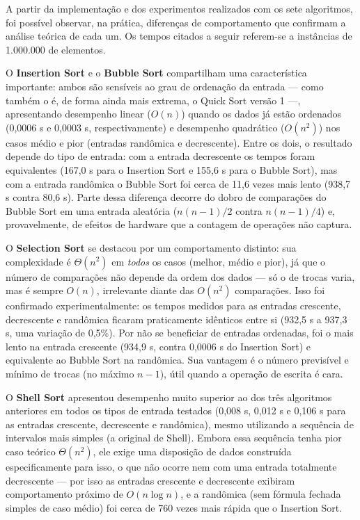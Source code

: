 \qquad A partir da implementação e dos experimentos realizados com os
sete algoritmos, foi possível observar, na prática, diferenças de
comportamento que confirmam a análise teórica de cada um. Os tempos
citados a seguir referem-se a instâncias de 1.000.000 de elementos.

\qquad O \textbf{Insertion Sort} e o \textbf{Bubble Sort} compartilham uma
característica importante: ambos são sensíveis ao grau de ordenação
da entrada --- como também o é, de forma ainda mais extrema, o Quick
Sort versão 1 ---, apresentando desempenho linear ($O(n)$) quando os
dados já estão ordenados (0,0006 s e 0,0003 s, respectivamente) e desempenho
quadrático ($O(n^2)$) nos casos médio e pior (entradas randômica e
decrescente). Entre os dois, o resultado depende do tipo de entrada:
com a entrada decrescente os tempos foram equivalentes (167,0 s para o
Insertion Sort e 155,6 s para o Bubble Sort), mas com a entrada
randômica o Bubble Sort foi cerca de 11,6 vezes mais lento (938,7 s
contra 80,6 s). Parte dessa diferença decorre do dobro de comparações do
Bubble Sort em uma entrada aleatória ($n(n-1)/2$ contra $n(n-1)/4$) e,
provavelmente, de efeitos de hardware que a contagem de operações não
captura.

\qquad O \textbf{Selection Sort} se destacou por um comportamento distinto:
sua complexidade é $\Theta(n^2)$ em \textit{todos} os casos (melhor, médio e
pior), já que o número de comparações não depende da ordem dos dados
--- só o de trocas varia, mas é sempre $O(n)$, irrelevante diante das
$O(n^2)$ comparações.
Isso foi confirmado experimentalmente: os tempos medidos para as
entradas crescente, decrescente e randômica ficaram praticamente
idênticos entre si (932,5 s a 937,3 s, uma variação de 0,5\%). Por não
se beneficiar de entradas ordenadas, foi o mais lento na entrada
crescente (934,9 s, contra 0,0006 s do Insertion Sort) e equivalente ao
Bubble Sort na randômica. Sua vantagem
é o número previsível e mínimo de trocas (no máximo $n-1$), útil quando
a operação de escrita é cara.

\qquad O \textbf{Shell Sort} apresentou desempenho muito superior ao dos
três algoritmos anteriores em todos os tipos de entrada testados
(0,008 s, 0,012 s e 0,106 s para as entradas crescente, decrescente e
randômica), mesmo utilizando a sequência de intervalos mais simples (a
original de Shell). Embora essa sequência tenha pior caso teórico
$\Theta(n^2)$, ele exige uma disposição de dados construída
especificamente para isso, o que não ocorre nem com uma entrada
totalmente decrescente --- por isso as entradas crescente e decrescente
exibiram comportamento próximo de $O(n \log n)$, e a randômica (sem
fórmula fechada simples de caso médio) foi cerca de 760 vezes mais
rápida que o Insertion Sort.

